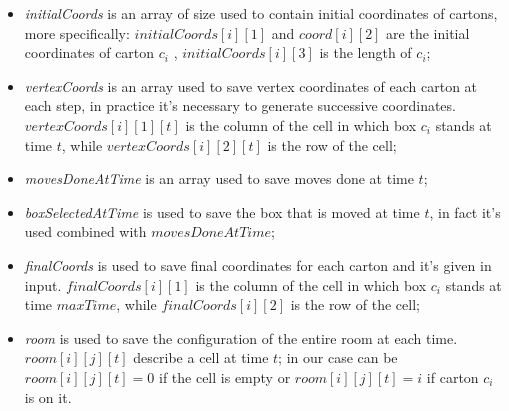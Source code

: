 \documentclass[headinclude, footinclude, abstract=on]{scrarticle}
\begin{document}
\begin{itemize}
    \item \textit{initialCoords} is an array of size used to contain initial coordinates of cartons, more specifically: $initialCoords[i][1]$ and $coord[i][2]$ are the initial coordinates of carton $c_i$ , $initialCoords[i][3]$ is the length of $c_i$; 
    \item \textit{vertexCoords} is an array used to save vertex coordinates of each carton at each step, in practice it's necessary to generate successive coordinates. $vertexCoords[i][1][t]$ is the column of the cell in which box $c_i$ stands at time $t$, while $vertexCoords[i][2][t]$ is the row of the cell; 
    \item \textit{movesDoneAtTime} is an array used to save moves done at time $t$;
    \item \textit{boxSelectedAtTime} is used to save the box that is moved at time $t$, in fact it's used combined with $movesDoneAtTime$;
    \item \textit{finalCoords} is used to save final coordinates for each carton and it's given in input. $finalCoords[i][1]$ is the column of the cell in which box $c_i$ stands at time $maxTime$, while $finalCoords[i][2]$ is the row of the cell;
    \item \textit{room} is used to save the configuration of the entire room at each time. $room[i][j][t]$ describe a cell at time $t$; in our case can be $room[i][j][t] = 0$ if the cell is empty or $room[i][j][t] = i$ if carton $c_i$ is on it.
\end{itemize}
\end{document}
